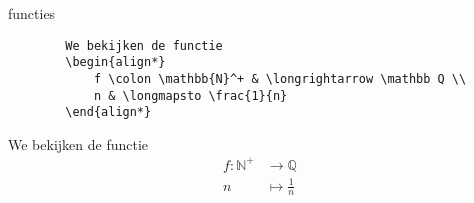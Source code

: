 \begin{frame}[fragile]{functies}

    \begin{verbatim}
        We bekijken de functie
        \begin{align*}
            f \colon \mathbb{N}^+ & \longrightarrow \mathbb Q \\
            n & \longmapsto \frac{1}{n}
        \end{align*}
    \end{verbatim}

    \begin{tcolorbox}[width=11cm, size=small]
        We bekijken de functie
        \begin{align*}
            f \colon \mathbb{N}^+ & \longrightarrow \mathbb{Q} \\
            n & \longmapsto \frac{1}{n}
        \end{align*}
    \end{tcolorbox}
\end{frame}